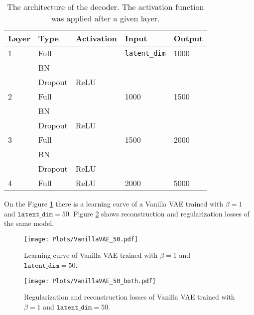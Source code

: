 \documentclass[a4paper,11pt]{article}
\begin{document}
\begin{table}[H]
\centering
\begin{tabular}{|l l l l l|}
\hline
 \textbf{Layer} & \textbf{Type} &  \textbf{Activation} &  \textbf{Input} &  \textbf{Output} \\ \hline
 1 & Full &   &  \texttt{latent\_dim} &  1000 \\ \
   & BN &   &   &    \\ \
   & Dropout &  ReLU &   &    \\ \hline
 2 & Full &   &  1000 &  1500 \\ \
   & BN &   &   &   \\ \
   & Dropout &  ReLU &   &    \\ \hline
 3 & Full &   &  1500 &  2000 \\ \
   & BN &   &   &   \\ \
   &Dropout &  ReLU &   &    \\ \hline
 4 & Full &  ReLU &  2000 &  5000 \\ \hline
\end{tabular}
\caption{The architecture of the decoder. The activation function was applied after a given layer.}
\label{decoder1}
\end{table}
\noindent On the Figure \ref{VAE1} there is a learning curve of a Vanilla VAE trained with $\beta = 1$ and $\texttt{latent\_dim}=50$. Figure \ref{VAE2} shows reconstruction and regularization losses of the same model.
\begin{figure}[H]
    \centering
    \texttt{[image: Plots/VanillaVAE\_50.pdf]}
    \caption{Learning curve of Vanilla VAE trained with $\beta=1$ and  $\texttt{latent\_dim}=50$.}
    \label{VAE1}
\end{figure}

\begin{figure}[H]
    \centering
    \texttt{[image: Plots/VanillaVAE\_50\_both.pdf]}
    \caption{Regularization and reconstruction losses of Vanilla VAE trained with $\beta=1$ and  $\texttt{latent\_dim}=50$.}
    \label{VAE2}
\end{figure}
\end{document}
